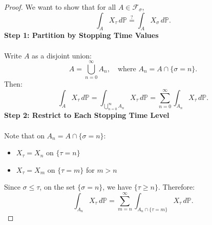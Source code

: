 \documentclass[11pt,a4paper]{article}
\theoremstyle{definition}
\begin{document}
\begin{proof}
We want to show that for all $A \in \mathcal{F}_\sigma$,
\[
\int_A X_\tau \, d\mathbb{P} \stackrel{?}{=} \int_A X_\sigma \, d\mathbb{P}.
\]
\textbf{Step 1: Partition by Stopping Time Values}
\\ ~\\ \noindent
Write $A$ as a disjoint union:
\[
A = \bigcup_{n=0}^\infty A_n, \quad \text{where } A_n = A \cap \{\sigma = n\}.
\]
Then:
\[
\int_A X_\tau \, d\mathbb{P} = \int_{\bigcup_{n=0}^\infty A_n} X_\tau \, d\mathbb{P} = \sum_{n=0}^\infty \int_{A_n} X_\tau \, d\mathbb{P}.
\]
\textbf{Step 2: Restrict to Each Stopping Time Level}
~\\~\\ \noindent
Note that on $A_n = A \cap \{\sigma = n\}$:
\begin{itemize}
    \item $X_\tau = X_n$ on $\{\tau = n\}$
    \item $X_\tau = X_m$ on $\{\tau = m\}$ for $m > n$
\end{itemize}

Since $\sigma \leq \tau$, on the set $\{\sigma = n\}$, we have $\{\tau \geq n\}$. Therefore:
\[
\int_{A_n} X_\tau \, d\mathbb{P} = \sum_{m=n}^\infty \int_{A_n \cap \{\tau = m\}} X_\tau \, d\mathbb{P}.
\]


\end{proof}
\end{document}

